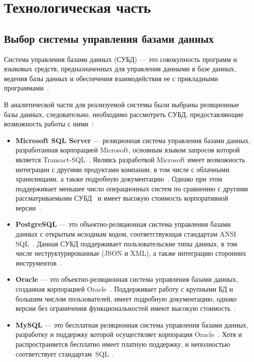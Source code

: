 \chapter{\label{impl}Технологическая часть}

\section{Выбор системы управления базами данных}

Система управления базами данных (СУБД) --- это совокупность программ и языковых
средств, предназначенных для управления данными в базе данных, ведения базы
данных и обеспечения взаимодействия ее с прикладными программами~\cite{gost01}.

В аналитической части для реализуемой системы были выбраны реляционные
базы данных, следовательно, необходимо рассмотреть СУБД, предоставляющие
возможность работы с ними~\cite{site19}:
\begin{itemize}
    \item \textbf{Microsoft SQL Server} --- реляционная система управления
        базами данных, разработанная корпорацией Microsoft, основным языком
        запросов которой является Transact-SQL~\cite{art06}. Являясь разработкой
        Microsoft имеет возможность интеграции с другими продуктами компании, в
        том числе с облачными хранилищами, а также подробную
        документацию~\cite{site10}. Однако при этом поддерживает меньшее число
        операционных систем по сравнению с другими рассматриваемыми
        СУБД~\cite{art07} и имеет высокую стоимость корпоративной
        версии~\cite{site11}.
    \item \textbf{PostgreSQL} --- это объектно-реляционная система управления
        базами данных с открытым исходным кодом, соответствующая стандартам ANSI
        SQL~\cite{site08}.  Данная СУБД поддерживает пользовательские типы
        данных, в том числе неструктурированные (JSON и XML), а также интеграцию
        сторонних инструментов~\cite{site12}.
    \item \textbf{Oracle} --- это объектно-реляционная система управления базами
        данных, созданная корпорацией Oracle~\cite{site09}. Поддерживает работу
        с крупными БД и большим числом пользователей, имеет подробную
        документацию, однако версии без ограничения функциональностей имеют
        высокую стоимость~\cite{site13}.
    \item \textbf{MySQL} --- это бесплатная реляционная система управления
        базами данных, разработку и поддержку которой осуществляет корпорация
        Oracle~\cite{art06}.  Хотя и распространяется бесплатно имеет платную
        поддержку, и неполностью соответствует стандартам~SQL~\cite{site12}.
\end{itemize}


